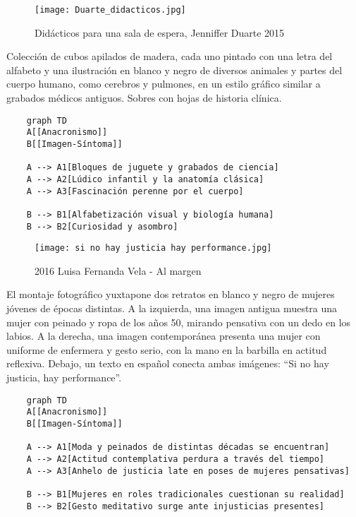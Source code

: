 \clearpage
\begin{figure}[h!]
    \centering
    \texttt{[image: Duarte\_didacticos.jpg]}
    \caption{Didácticos para una sala de espera, Jenniffer Duarte 2015}
    \label{fig:JennifferDuarte2015}
\end{figure}

Colección de cubos apilados de madera, cada uno pintado con una letra del alfabeto y una ilustración en blanco y negro de diversos animales y partes del cuerpo humano, como cerebros y pulmones, en un estilo gráfico similar a grabados médicos antiguos. Sobres con hojas de historia clínica.

\small
\begin{verbatim}
    graph TD
    A[[Anacronismo]]
    B[[Imagen-Síntoma]]

    A --> A1[Bloques de juguete y grabados de ciencia]
    A --> A2[Lúdico infantil y la anatomía clásica]
    A --> A3[Fascinación perenne por el cuerpo]

    B --> B1[Alfabetización visual y biología humana]
    B --> B2[Curiosidad y asombro]
\end{verbatim}
\normalsize

\clearpage
\begin{figure}[h!]
    \centering
    \texttt{[image: si no hay justicia hay performance.jpg]}
    \caption{2016 Luisa Fernanda Vela - Al margen}
    \label{fig:LuisaVela2016}
\end{figure}

El montaje fotográfico yuxtapone dos retratos en blanco y negro de mujeres jóvenes de épocas distintas. A la izquierda, una imagen antigua muestra una mujer con peinado y ropa de los años 50, mirando pensativa con un dedo en los labios. A la derecha, una imagen contemporánea presenta una mujer con uniforme de enfermera y gesto serio, con la mano en la barbilla en actitud reflexiva. Debajo, un texto en español conecta ambas imágenes: ``Si no hay justicia, hay performance''.

\small
\begin{verbatim}
    graph TD
    A[[Anacronismo]]
    B[[Imagen-Síntoma]]

    A --> A1[Moda y peinados de distintas décadas se encuentran]
    A --> A2[Actitud contemplativa perdura a través del tiempo]
    A --> A3[Anhelo de justicia late en poses de mujeres pensativas]

    B --> B1[Mujeres en roles tradicionales cuestionan su realidad]
    B --> B2[Gesto meditativo surge ante injusticias presentes]
\end{verbatim}
\normalsize